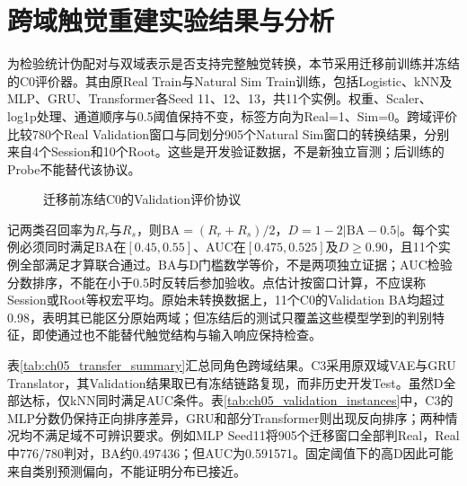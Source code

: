 \section{跨域触觉重建实验结果与分析}
\label{sec:ch05_reconstruction_results}

为检验统计伪配对与双域表示是否支持完整触觉转换，本节采用迁移前训练并冻结的C0评价器。其由原Real Train与Natural Sim Train训练，包括Logistic、kNN及MLP、GRU、Transformer各Seed 11、12、13，共11个实例。权重、Scaler、log1p处理、通道顺序与0.5阈值保持不变，标签方向为Real=1、Sim=0。跨域评价比较780个Real Validation窗口与同划分905个Natural Sim窗口的转换结果，分别来自4个Session和10个Root。这些是开发验证数据，不是新独立盲测；后训练的Probe不能替代该协议。

\begin{figure}[htbp]
 \centering
 \caption{迁移前冻结C0的Validation评价协议}
 \label{fig:ch05_c0_validation_protocol}
\end{figure}

记两类召回率为$R_r$与$R_s$，则$\mathrm{BA}=(R_r+R_s)/2$，$D=1-2|\mathrm{BA}-0.5|$。每个实例必须同时满足BA在$[0.45,0.55]$、AUC在$[0.475,0.525]$及$D\ge0.90$，且11个实例全部满足才算联合通过。BA与D门槛数学等价，不是两项独立证据；AUC检验分数排序，不能在小于0.5时反转后参加验收。点估计按窗口计算，不应误称Session或Root等权宏平均。原始未转换数据上，11个C0的Validation BA均超过0.98，表明其已能区分原始两域；但冻结后的测试只覆盖这些模型学到的判别特征，即使通过也不能替代触觉结构与输入响应保持检查。

表\ref{tab:ch05_transfer_summary}汇总同角色跨域结果。C3采用原双域VAE与GRU Translator，其Validation结果取已有冻结链路复现，而非历史开发Test。虽然D全部达标，仅kNN同时满足AUC条件。表\ref{tab:ch05_validation_instances}中，C3的MLP分数仍保持正向排序差异，GRU和部分Transformer则出现反向排序；两种情况均不满足域不可辨识要求。例如MLP Seed11将905个迁移窗口全部判Real，Real中776/780判对，BA约0.497436；但AUC为0.591571。固定阈值下的高D因此可能来自类别预测偏向，不能证明分布已接近。

